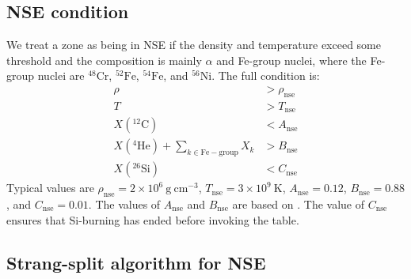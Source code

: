 \documentclass[times,modern]{aastex63}
\newcommand{\isot}[2]{$^{#2}\mathrm{#1}$}
\newcommand{\isotm}[2]{{}^{#2}\mathrm{#1}}
\newcommand{\gcc}{\mathrm{g~cm^{-3} }}
\newcommand{\rhonse}{{\rho_\mathrm{nse}}}
\newcommand{\tnse}{{T_\mathrm{nse}}}
\newcommand{\Anse}{{A_\mathrm{nse}}}
\newcommand{\Bnse}{{B_\mathrm{nse}}}
\newcommand{\Cnse}{{C_\mathrm{nse}}}
\begin{document}
\subsection{NSE condition}

We treat a zone as being in NSE if the density and temperature exceed
some threshold and the composition is mainly $\alpha$ and Fe-group
nuclei, where the Fe-group nuclei are \isot{Cr}{48}, \isot{Fe}{52},
\isot{Fe}{54}, and \isot{Ni}{56}.  The full condition is:
\begin{align}
\rho &> \rhonse \\
T &> \tnse \\
X(\isotm{C}{12}) &< \Anse \\
X(\isotm{He}{4}) + \sum_{k \in \mathrm{Fe-group}} X_k &> \Bnse \\
X(\isotm{Si}{26}) &< \Cnse 
\end{align}
Typical values are $\rhonse = 2\times 10^6~\gcc$, $T_\mathrm{nse} =
3\times 10^9~\mathrm{K}$, $\Anse = 0.12$, $\Bnse=
0.88$, and $\Cnse = 0.01$.  The values of $\Anse$ and $\Bnse$ are based on \citet{ma:2013}.
The value of $\Cnse$ ensures that Si-burning has ended before invoking the table.


\subsection{Strang-split algorithm for NSE}
\end{document}
